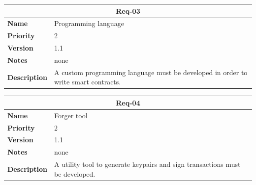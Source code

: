 \documentclass[../documentation.tex]{subfiles}
\begin{document}
\bgroup{}
\def\arraystretch{1.25}
\begin{center}
    \begin{tabular}{ |l|p{9cm}| }
        \hline
        \multicolumn{2}{|c|}{\textbf{Req-03}} \\
        \hline
        \textbf{Name} & Programming language \\
        \hline
        \textbf{Priority} & 2 \\
        \hline
        \textbf{Version} & 1.1 \\
        \hline
        \textbf{Notes} & none \\
        \hline
        \textbf{Description} &A custom programming language must be developed in order to write smart contracts. \\
        \hline
    \end{tabular}
\end{center}
\egroup{}

\bgroup{}
\def\arraystretch{1.25}
\begin{center}
    \begin{tabular}{ |l|p{9cm}| }
        \hline
        \multicolumn{2}{|c|}{\textbf{Req-04}} \\
        \hline
        \textbf{Name} & Forger tool \\
        \hline
        \textbf{Priority} & 2 \\
        \hline
        \textbf{Version} & 1.1 \\
        \hline
        \textbf{Notes} & none \\
        \hline
        \textbf{Description} & A utility tool to generate keypairs and sign transactions must be developed. \\
        \hline
    \end{tabular}
\end{center}
\egroup{}
\end{document}
